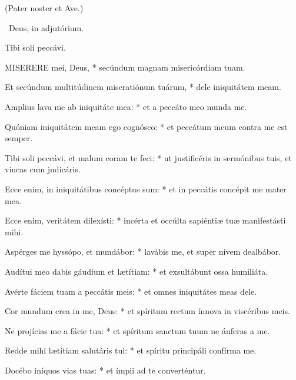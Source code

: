 


(Pater noster et Ave.)

\V\ Deus, in adjutórium.

 Tibi soli peccávi.


\lettrine[lines=2]{M}{ISERERE} mei, Deus, * secúndum magnam misericórdiam tuam.

Et secúndum multitúdinem miseratiónum tuárum, * dele iniquitátem meam.

Amplius lava me ab iniquitáte mea: * et a peccáto meo munda me.

Quóniam iniquitátem meam ego cognósco: * et peccátum meum contra me est semper.

Tibi soli peccávi, et malum coram te feci: * ut justificéris in sermónibus tuis, et vincas cum judicáris.

Ecce enim, in iniquitátibus concéptus sum: * et in peccátis concépit me mater mea.

Ecce enim, veritátem dilexísti: * incérta et occúlta sapiéntiæ tuæ manifestásti mihi.

Aspérges me hyssópo, et mundábor: * lavábis me, et super nivem dealbábor.

Audítui meo dabis gáudium et lætítiam: * et exsultábunt ossa humiliáta.

Avérte fáciem tuam a peccátis meis: * et omnes iniquitátes meas dele.

Cor mundum crea in me, Deus: * et spíritum rectum ínnova in viscéribus meis.

Ne projícias me a fácie tua: * et spíritum sanctum tuum ne áuferas a me.

Redde mihi lætítiam salutáris tui: * et spíritu principáli confírma me.

Docébo iníquos vias tuas: * et ímpii ad te converténtur.

